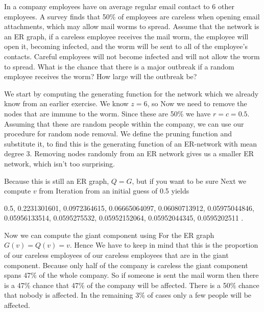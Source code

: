 
\label{exAttackWorm}In a company employees have on average regular email contact to 6 other employees. A survey finds that 50\% of employees are careless when opening email attachments, which may allow mail worms to spread. Assume that the network is an ER graph, if a careless employee receives the mail worm, the employee will open it, becoming infected, and the worm will be sent to all of the employee's contacts. Careful employees will not become infected and will not allow the worm to spread. What is the chance that there is a major outbreak if a random employee receives the worm? How large will the outbreak be? 

\solution
We start by computing the generating function for the network 
which we already know from an earlier exercise. We know $z=6$, so 
Now we need to remove the nodes that are immune to the worm. Since these are 50\% we have $r=c=0.5$. Assuming that these are random people within the company, we can use our procedure for random node removal. We define the pruning function 
and substitute it, to find 
this is the generating function of an ER-network with mean degree 3. Removing nodes randomly from an ER network gives us a smaller ER network, which isn't too surprising.

Because this is still an ER graph, $Q=G$, but if you want to be sure 
Next we compute $v$ from 
Iteration from an initial guess of 0.5 yields 
\begin{center}
0.5, 0.2231301601, 0.0972364615, 0.06665064097, 0.06080713912, 0.05975044846, 0.05956133514, 0.0595275532, 0.05952152064, 0.05952044345, 0.0595202511  .  
\end{center}

Now we can compute the giant component using 
For the ER graph $G(v)=Q(v)=v$. Hence 
We have to keep in mind that this is the proportion of our careless employees of our careless employees that are in the giant component. Because only half of the company is careless the giant component spans 47\% of the whole company. So if someone is sent the mail worm then there is a 47\% chance that 47\% of the company will be affected. There is a 50\% chance that nobody is affected. In the remaining 3\% of cases only a few people will be affected.  